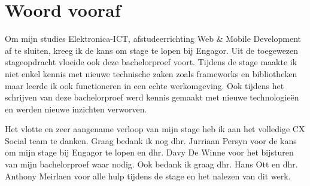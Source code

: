 \newpage
\chapter{Woord vooraf}
\vspace{-3cm}
Om mijn studies Elektronica-ICT, afstudeerrichting Web \& Mobile Development af te sluiten, kreeg ik de kans om stage te lopen bij Engagor. Uit de toegewezen stageopdracht vloeide ook deze bachelorproef voort. Tijdens de stage maakte ik niet enkel kennis met nieuwe technische zaken zoals frameworks en bibliotheken maar leerde ik ook functioneren in een echte werkomgeving. Ook tijdens het schrijven van deze bachelorproef werd kennis gemaakt met nieuwe technologie\"{e}n en werden nieuwe inzichten verworven. 

Het vlotte en zeer aangename verloop van mijn stage heb ik aan het volledige CX Social team te danken. Graag bedank ik nog dhr. Jurriaan Persyn voor de kans om mijn stage bij Engagor te lopen en dhr. Davy De Winne voor het bijsturen van mijn bachelorproef waar nodig. Ook bedank ik graag dhr. Hans Ott en dhr. Anthony Meirlaen voor alle hulp tijdens de stage en het nalezen van dit werk. 







\iffalse
\begin{slshape}
Met deze bachelorproef willen we onze bacheloropleiding in de Bio-ingenieurswetenschappen afsluiten. Na veel opzoekingswerk zijn we trots op het resultaat. Dit project heeft ons namelijk op verschillende vlakken veel bijgeleerd: het gebruik van de computers in de voeding, programmeren in R, informatie bundelen in een beperkt aantal pagina's, etc.

Uiteraard was dit alles niet mogelijk geweest zonder de hulp van een aantal mensen. We willen dan ook Marlies en Michiel bedanken voor de vele meetings, de tijd die ze voor ons hebben vrijgemaakt en de hulp bij het implementeren van het Naive Bayes algoritme. Zonder hun raad en tips was dit alles ons niet gelukt. Vervolgens gaat onze dank ook uit naar professor De Baets en professor Waegeman voor hun advies bij het schrijven van deze bachelorproef.
\end{slshape}
\fi



